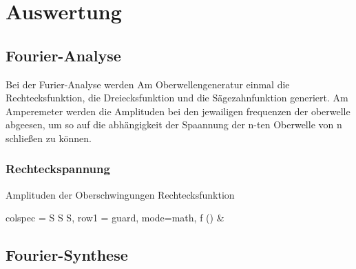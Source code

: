 \section{Auswertung}
\label{sec:Auswertung}

\subsection{Fourier-Analyse}
Bei der Furier-Analyse werden Am Oberwellengeneratur einmal die Rechtecksfunktion,
die Dreiecksfunktion und die Sägezahnfunktion generiert. Am Amperemeter werden 
die Amplituden bei den jewailigen frequenzen der oberwelle 
abgeesen, um so auf die abhängigkeit der Spaannung der n-ten Oberwelle von n schließen zu können.
\subsubsection{Rechteckspannung}
\begin{table}
    \caption{Amplituden der Oberschwingungen Rechtecksfunktion}
    \label{tab:j1}
    \begin{tblr}{
        colspec = {S S S},
        row{1} = {guard, mode=math},
      }
    \toprule
    f (\unit{}) &  \\
    \midrule
    \end{tblr}
\end{table}


\subsection{Fourier-Synthese}